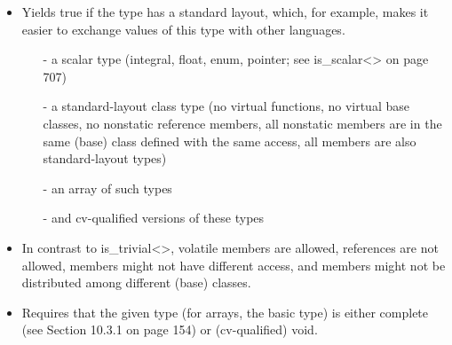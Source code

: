 \begin{itemize}
\item 
Yields true if the type has a standard layout, which, for example, makes it easier to exchange values of this type with other languages.

\begin{itemize}
\item [-]
a scalar type (integral, float, enum, pointer; see is\_scalar<> on page 707)

\item [-]
a standard-layout class type (no virtual functions, no virtual base classes, no nonstatic reference members, all nonstatic members are in the same (base) class defined with the same access, all members are also standard-layout types)

\item [-]
an array of such types

\item [-]
and cv-qualified versions of these types
\end{itemize}

\item 
In contrast to is\_trivial<>, volatile members are allowed, references are not allowed, members might not have different access, and members might not be distributed among different (base) classes.

\item 
Requires that the given type (for arrays, the basic type) is either complete (see Section 10.3.1 on page 154) or (cv-qualified) void.
\end{itemize}


